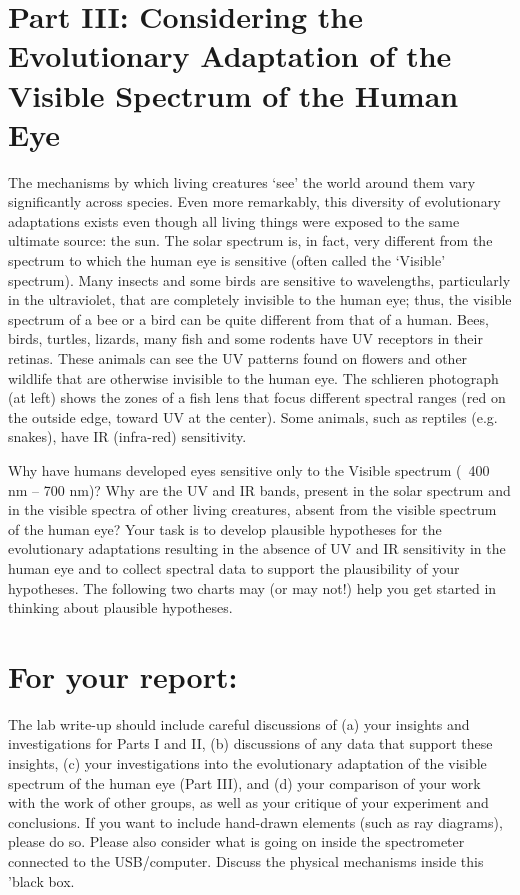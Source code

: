 \section*{Part III: Considering the Evolutionary Adaptation of the Visible Spectrum of the Human Eye}
The mechanisms by which living creatures `see' the world around them vary significantly across species. 
Even more remarkably, this diversity of evolutionary adaptations exists even though all living things were exposed to the same ultimate source: the sun. 
The solar spectrum is, in fact, very different from the spectrum to which the human eye is sensitive (often called the ‘Visible’ spectrum). 
Many insects and some birds are sensitive to wavelengths, particularly in the ultraviolet, that are completely invisible to the human eye; thus, the visible spectrum of a bee or a bird can be quite different from that of a human. 
Bees, birds, turtles, lizards, many fish and some rodents have UV receptors in their retinas. 
These animals can see the UV patterns found on flowers and other wildlife that are otherwise invisible to the human eye. 
The schlieren photograph (at left) shows the zones of a fish lens that focus different spectral ranges (red on the outside edge, toward UV at the center). 
Some animals, such as reptiles (e.g. snakes), have IR (infra-red) sensitivity. 
\par 
Why have humans developed eyes sensitive only to the Visible spectrum (~400 nm – 700 nm)? 
Why are the UV and IR bands, present in the solar spectrum and in the visible spectra of other living creatures, absent from the visible spectrum of the human eye? 
Your task is to develop plausible hypotheses for the evolutionary adaptations resulting in the absence of UV and IR sensitivity in the human eye and to collect spectral data to support the plausibility of your hypotheses. 
The following two charts may (or may not!) help you get started in thinking about plausible hypotheses.

\section*{For your report:}
The lab write-up should include careful discussions of (a) your insights and investigations for Parts I and II, (b) discussions of any data that support these insights, (c) your investigations into the evolutionary adaptation of the visible spectrum of the human eye (Part III), and (d) your comparison of your work with the work of other groups, as well as your critique of your experiment and conclusions. 
If you want to include hand-drawn elements (such as ray diagrams), please do so. 
Please also consider what is going on inside the spectrometer connected to the USB/computer. 
Discuss the physical mechanisms inside this 'black box.